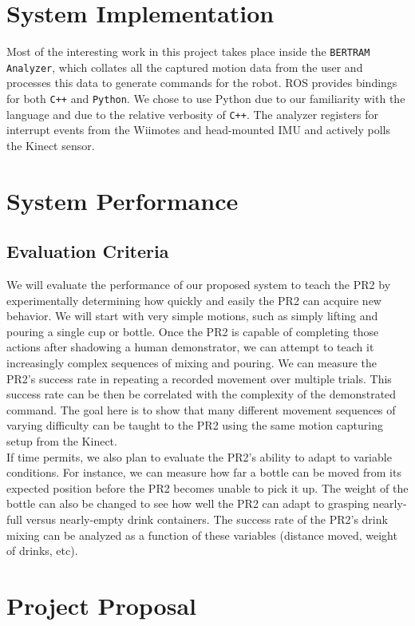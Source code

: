 \documentclass{sig-alternate}
\begin{document}
\section{System Implementation}
Most of the interesting work in this project takes place inside the
{\tt BERTRAM Analyzer}, which collates all the captured motion data from the
user and processes this data to generate commands for the robot. ROS provides
bindings for both {\tt C++} and {\tt Python}. We chose to use Python due to our
familiarity with the language and due to the relative verbosity of {\tt C++}.
The analyzer registers for interrupt events from the Wiimotes and head-mounted
IMU and actively polls the Kinect sensor.

\section{System Performance}
\subsection{Evaluation Criteria}
\label{subsec:eval_criteria}
We will evaluate the performance of our proposed system to teach the PR2 by experimentally determining how quickly and easily the PR2
can acquire new behavior. We will start with very simple motions, such as simply lifting and pouring a single cup or bottle. Once the PR2 is capable of completing those actions after shadowing a human demonstrator, we can attempt to teach it increasingly complex sequences of mixing and pouring. We can measure the PR2's success rate in repeating a recorded movement over multiple trials. This success rate can be then be correlated with the complexity of the demonstrated command. The goal here is to show that many different movement sequences of varying difficulty can be taught to the PR2 using the same motion capturing setup from the Kinect.\\
If time permits, we also plan to evaluate the PR2's ability to adapt to variable conditions. For instance, we can measure how far a bottle can be moved from its expected position before the PR2 becomes unable to pick it up. The weight of the bottle can also be changed to see how well the PR2 can adapt to grasping nearly-full versus nearly-empty drink containers. The success rate of the PR2's drink mixing can be analyzed as a function of these variables (distance moved, weight of drinks, etc).
\section{Project Proposal}
\end{document}
